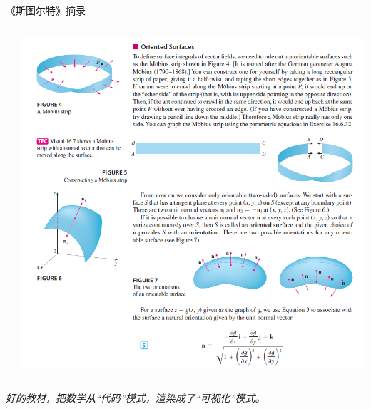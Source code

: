 \documentclass{beamer}
\begin{document}
\begin{frame}{《斯图尔特》摘录}
\begin{columns}
\begin{column}{0.3\textwidth}
        \end{column}
        \begin{column}{0.3\textwidth} %
            \centering
            \includegraphics[width=\textwidth]{assets/calculus3.png}
        \end{column}
    \end{columns}
    
    \vspace{0.5cm} %
    \begin{center}
        \Large \textit{好的教材，把数学从“代码”模式，渲染成了“可视化”模式。}
    \end{center}
\end{frame}
\end{document}
